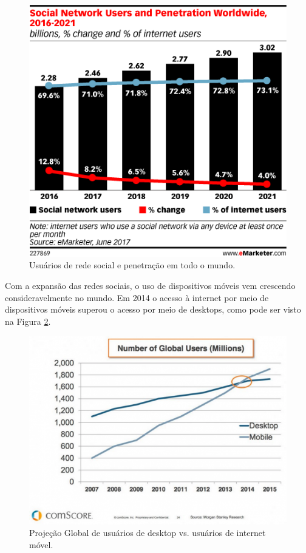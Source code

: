 \begin{figure}[H]
	\caption{\label{fig:figura1}Usuários de rede social e penetração em todo o mundo.}
	\centering
	\includegraphics[scale=0.5]{imagens/figura1.png}
\end{figure}

Com a expansão das redes sociais, o uso de dispositivos móveis vem crescendo consideravelmente no mundo. Em 2014 o acesso à internet por meio de dispositivos móveis superou o acesso por meio de desktops, como pode ser visto na Figura \ref{fig:figura2}.

\begin{figure}[H]
	\caption{\label{fig:figura2}Projeção Global de usuários de desktop vs. usuários de internet móvel.}
	\centering
	\includegraphics[scale=0.5]{imagens/figura2.png}
\end{figure}

